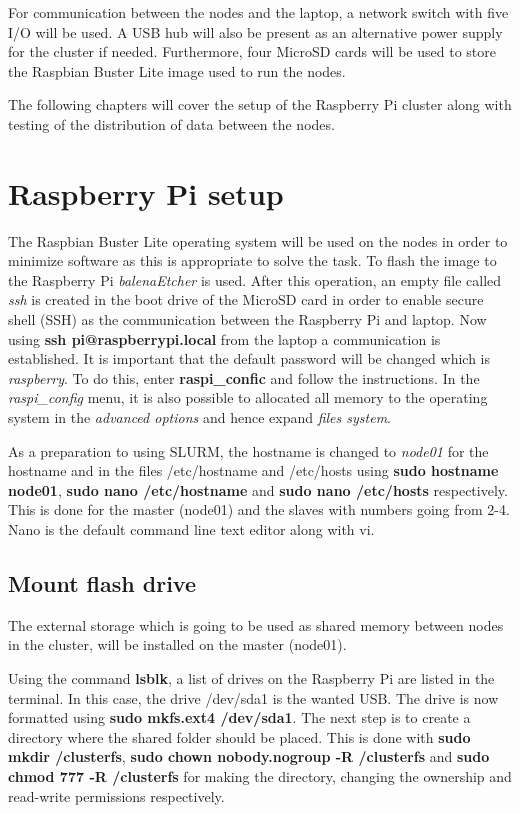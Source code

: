 \documentclass[../Head/Report.tex]{subfiles}
\begin{document}
For communication between the nodes and the laptop, a network switch with five I/O will be used. A USB hub will also be present as an alternative power supply for the cluster if needed. Furthermore, four MicroSD cards will be used to store the Raspbian Buster Lite image used to run the nodes.  

The following chapters will cover the setup of the Raspberry Pi cluster along with testing of the distribution of data between the nodes.   

\section{Raspberry Pi setup}
The Raspbian Buster Lite operating system will be used on the nodes in order to minimize software as this is appropriate to solve the task. To flash the image to the Raspberry Pi \textit{balenaEtcher} is used. After this operation, an empty file called \textit{ssh} is created in the boot drive of the MicroSD card in order to enable secure shell (SSH) as the communication between the Raspberry Pi and laptop. Now using \textbf{ssh pi@raspberrypi.local} from the laptop a communication is established. It is important that the default password will be changed which is \textit{raspberry}. To do this, enter \textbf{raspi\_confic} and follow the instructions. In the \textit{raspi\_config} menu, it is also possible to allocated all memory to the operating system in the \textit{advanced options} and hence expand \textit{files system}.   

As a preparation to using SLURM, the hostname is changed to \textit{node01} for the hostname and in the files /etc/hostname and /etc/hosts using \textbf{sudo hostname node01}, \textbf{sudo nano /etc/hostname} and \textbf{sudo nano /etc/hosts} respectively. This is done for the master (node01) and the slaves with numbers going from 2-4. Nano is the default command line text editor along with vi.  

\subsection{Mount flash drive}
The external storage which is going to be used as shared memory between nodes in the cluster, will be installed on the master (node01). 

Using the command \textbf{lsblk}, a list of drives on the Raspberry Pi are listed in the terminal. In this case, the drive /dev/sda1 is the wanted USB. The drive is now formatted using \textbf{sudo mkfs.ext4 /dev/sda1}. The next step is to create a directory where the shared folder should be placed. This is done with \textbf{sudo mkdir /clusterfs}, \textbf{sudo chown nobody.nogroup -R /clusterfs} and \textbf{sudo chmod 777 -R /clusterfs} for making the directory, changing the ownership and read-write permissions respectively. 
\end{document}

